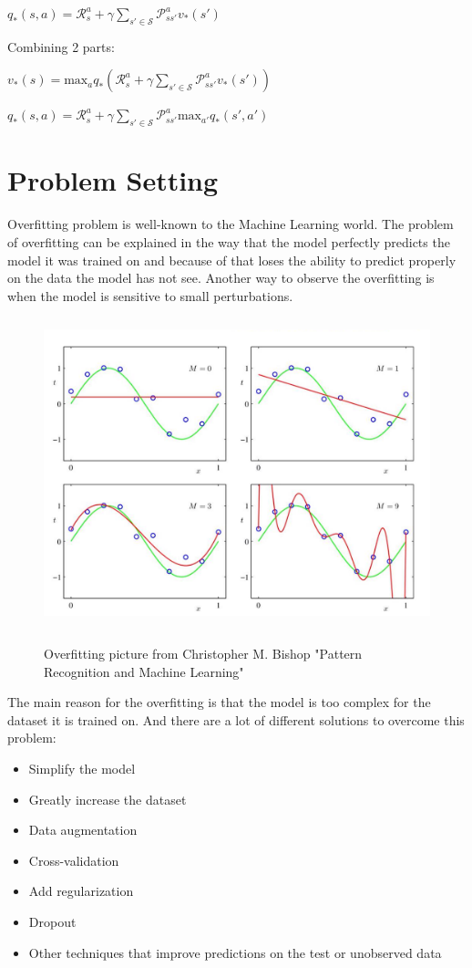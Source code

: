 $q_* (s,a)=\mathcal{R}^a_s + \gamma \sum_{s' \in \mathcal{S}} \mathcal{P}^a_{s s'} v_* (s')$

Combining 2 parts:

$v_*(s)=\text{max}_a q_* (\mathcal{R}^a_s + \gamma \sum_{s' \in \mathcal{S}} \mathcal{P}^a_{s s'} v_* (s'))$

$q_* (s,a)=\mathcal{R}^a_s + \gamma \sum_{s' \in \mathcal{S}} \mathcal{P}^a_{s s'} \text{max}_{a'} q_* (s',a')$

\section{Problem Setting}

Overfitting problem is well-known to the Machine Learning world. The problem of overfitting can be explained in the way that the model perfectly predicts the model it was trained on and because of that loses the ability to predict properly on the data the model has not see. Another way to observe the overfitting is when the model is sensitive to small perturbations.

\begin{figure}[H]
\centering
\includegraphics[height=9cm]{overfit.png}\\[0.5cm] 
\caption{Overfitting picture from Christopher M. Bishop "Pattern Recognition and Machine Learning"}
\end{figure}

The main reason for the overfitting is that the model is too complex for the dataset it is trained on. And there are a lot of different solutions to overcome this problem:
\begin{itemize}
    \item Simplify the model
    \item Greatly increase the dataset
    \item Data augmentation
    \item Cross-validation
    \item Add regularization
    \item Dropout
    \item Other techniques that improve predictions on the test or unobserved data
\end{itemize}

